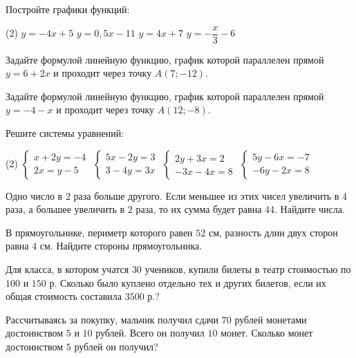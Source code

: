 \begin{class}[number=8]
	\begin{listofex}
		\item Постройте графики функций:
		\begin{tasks}(2)
			\task \( y=-4x+5 \)
			\task \( y=0,5x-11 \)
			\task \( y=4x+7 \)
			\task \( y=-\dfrac{ x }{ 3 }-6 \)
		\end{tasks}
		\item Задайте формулой линейную функцию, график которой параллелен прямой \(y=6+2x\) и проходит через точку \(A(7; -12)\).
		\item Задайте формулой линейную функцию, график которой параллелен прямой \(y=-4-x\) и проходит через точку \(A(12; -8)\).
		\item Решите системы уравнений:
		\begin{tasks}(2)
			\task \( \begin{cases} x+2y=-4 \\ 2x=y-5 \end{cases} \)
			\task \( \begin{cases} 5x-2y=3 \\ 3-4y=3x \end{cases} \)
			\task \( \begin{cases} 2y+3x=2\\-3x-4x=8 \end{cases} \)
			\task \( \begin{cases} 5y-6x=-7 \\ -6y-2x=8 \end{cases} \)
		\end{tasks}
		
		\item Одно число в \(2\) раза больше другого. Если меньшее из этих чисел увеличить в \(4\) раза, а большее увеличить в \(2\) раза, то их сумма будет равна \(44\). Найдите числа.
		\item В прямоугольнике, периметр которого равен \(52\) см, разность длин двух сторон равна \(4\) см. Найдите стороны прямоугольника.
		\item Для класса, в котором учатся \(30\) учеников, купили билеты в театр стоимостью по \(100\) и \(150\) р. Сколько было куплено отдельно тех и других билетов, если их общая стоимость составила \(3500\) р.?
		\item Рассчитываясь за покупку, мальчик получил сдачи \(70\) рублей монетами достоинством \(5\) и \(10\) рублей. Всего он получил \(10\) монет. Сколько монет достоинством \(5\) рублей он получил?
	\end{listofex}
\end{class}
